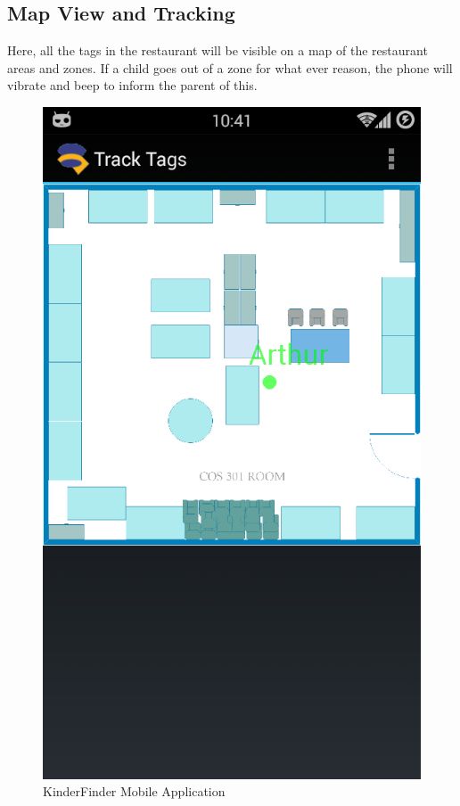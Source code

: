 \documentclass{article}
\begin{document}
\subsection{Map View and Tracking}
Here, all the tags in the restaurant will be visible on a map of the restaurant areas and zones. If a child goes out of a zone for what ever reason, the phone will vibrate and beep to inform the parent of this.
\begin{figure}[H]
\centering
\includegraphics[scale=0.4]{MainAppTrack Tags.png}
\caption{KinderFinder Mobile Application}
\end{figure}
\end{document}
